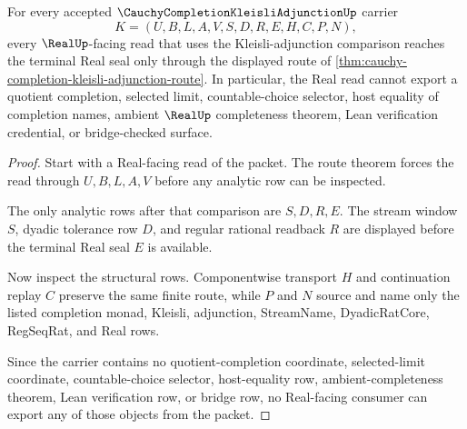 \begin{theorem}
\label{thm:cauchy-completion-kleisli-adjunction-real-nonescape}
For every accepted $\CauchyCompletionKleisliAdjunctionUp$ carrier
$$
K=(U,B,L,A,V,S,D,R,E,H,C,P,N),
$$
every $\RealUp$-facing read that uses the Kleisli-adjunction comparison reaches the terminal Real seal only through the displayed route of \autoref{thm:cauchy-completion-kleisli-adjunction-route}. In particular, the Real read cannot export a quotient completion, selected limit, countable-choice selector, host equality of completion names, ambient $\RealUp$ completeness theorem, Lean verification credential, or bridge-checked surface.
\end{theorem}
\begin{proof}
Start with a Real-facing read of the packet. The route theorem forces the read through $U,B,L,A,V$ before any analytic row can be inspected.

The only analytic rows after that comparison are $S,D,R,E$. The stream window $S$, dyadic tolerance row $D$, and regular rational readback $R$ are displayed before the terminal Real seal $E$ is available.

Now inspect the structural rows. Componentwise transport $H$ and continuation replay $C$ preserve the same finite route, while $P$ and $N$ source and name only the listed completion monad, Kleisli, adjunction, StreamName, DyadicRatCore, RegSeqRat, and Real rows.

Since the carrier contains no quotient-completion coordinate, selected-limit coordinate, countable-choice selector, host-equality row, ambient-completeness theorem, Lean verification row, or bridge row, no Real-facing consumer can export any of those objects from the packet.
\end{proof}


